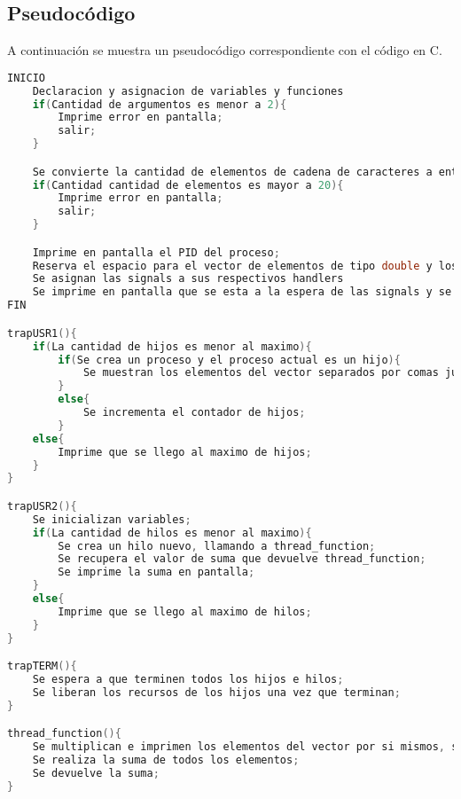 \subsection{Pseudocódigo}

A continuación se muestra un pseudocódigo correspondiente con el código en C.\\

\begin{lstlisting}[language=C]
INICIO
    Declaracion y asignacion de variables y funciones
    if(Cantidad de argumentos es menor a 2){
        Imprime error en pantalla;
        salir;
    }

    Se convierte la cantidad de elementos de cadena de caracteres a entero;
    if(Cantidad cantidad de elementos es mayor a 20){
        Imprime error en pantalla;
        salir;
    }

    Imprime en pantalla el PID del proceso;
    Reserva el espacio para el vector de elementos de tipo double y los genera;
    Se asignan las signals a sus respectivos handlers
    Se imprime en pantalla que se esta a la espera de las signals y se queda esperando;
FIN

trapUSR1(){
    if(La cantidad de hijos es menor al maximo){
        if(Se crea un proceso y el proceso actual es un hijo){
            Se muestran los elementos del vector separados por comas junto con la identificacion del proceso padre;
        }
        else{
            Se incrementa el contador de hijos;
        }
    else{
        Imprime que se llego al maximo de hijos;
    }
}

trapUSR2(){
    Se inicializan variables;
    if(La cantidad de hilos es menor al maximo){
        Se crea un hilo nuevo, llamando a thread_function;
        Se recupera el valor de suma que devuelve thread_function;
        Se imprime la suma en pantalla;
    }
    else{
        Imprime que se llego al maximo de hilos;
    }
}

trapTERM(){
    Se espera a que terminen todos los hijos e hilos;
    Se liberan los recursos de los hijos una vez que terminan;
}

thread_function(){
    Se multiplican e imprimen los elementos del vector por si mismos, separados por espacios;
    Se realiza la suma de todos los elementos;
    Se devuelve la suma;
}


\end{lstlisting}
